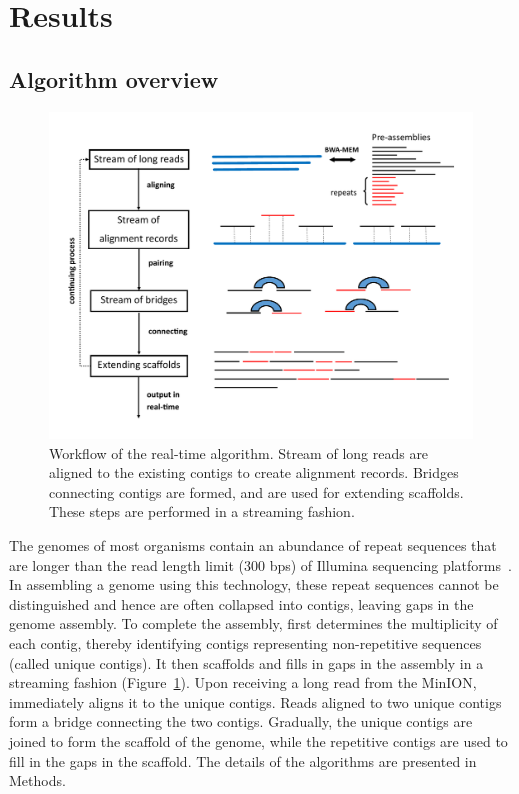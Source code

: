 \section{Results}

\subsection{Algorithm overview}

\begin{figure}[ht]
\centering
\includegraphics[width=\linewidth]{npscarf/figures/figure1.pdf}
\caption[Workflow of the real-time algorithm]{
Workflow of the real-time algorithm. Stream of long reads are aligned to the
existing contigs to create alignment records. Bridges connecting contigs are 
formed, and are used for extending scaffolds. These steps are performed in a
streaming fashion.}
\label{f:workflow}
\end{figure}

The genomes of most organisms contain an abundance of repeat sequences that are 
longer than the read length limit (300 bps) of Illumina sequencing 
platforms~\cite{TreangenS2012}. In assembling a genome using this technology, 
these repeat sequences cannot be distinguished and hence are often collapsed
into contigs, leaving gaps in the genome assembly. To complete the assembly, 
\npscarf{} first determines the multiplicity of each contig, thereby identifying
contigs representing non-repetitive sequences (called unique contigs).
It then scaffolds  and fills in gaps in the assembly in a streaming fashion
(Figure~\ref{f:workflow}). Upon receiving a long read from the MinION, \npscarf{}
immediately aligns it to the unique contigs. Reads aligned to two unique contigs
form a bridge connecting the two contigs. Gradually, the unique contigs are
joined to form the scaffold of the genome, while the repetitive contigs are
used to fill in the gaps in the scaffold. The details of the algorithms are
presented in Methods.

